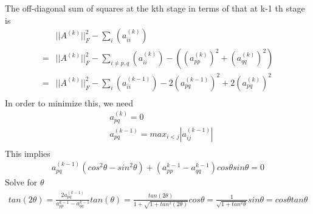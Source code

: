 \documentclass[a4paper]{article}
\begin{document}
The off-diagonal sum of squares at the kth stage in terms of that at k-1 th stage is
\begin{align*}
	& || A^{(k)}||^2_F - \sum_i (a_{ii}^{(k)}) \\
	= & || A^{(k)}||^2_F - \sum_{i \neq p,q} (a_{ii}^{(k)}) -( (a_{pp}^{(k)})^2 + (a_{qq}^{(k)})^2 ) \\
	= & || A^{(k)}||^2_F - \sum_i (a_{ii}^{(k-1)}) - 2 (a_{pq}^{(k-1)})^2  + 2 (a_{pq}^{(k)})^2  \\
\end{align*}
In order to minimize this, we need
\begin{align*}
	& a_{pq}^{(k)} = 0\\
	& a_{pq}^{(k-1)} = max _{i<j} |a_{ij} ^ {(k-1)}|\\
\end{align*}
This implies
\begin{align*}
	a_{pq}^{(k-1)} (cos^2 \theta - sin^2 \theta) + (a_{pp}^{k-1} - a_{qq}^{k-1}) cos \theta sin \theta = 0
\end{align*}
Solve for $\theta$
\begin{align*}
	tan(2\theta) = \frac{2 a_{pq}^{(k-1)}}{a_{pp}^{k-1} - a_{qq}^{k-1}}
	tan(\theta) = \frac{tan(2 \theta)}{1 + \sqrt{1 + tan^2 (2 \theta)}}
	cos \theta = \frac{1}{\sqrt{1 + tan^2 \theta}}
	sin \theta = cos \theta tan \theta
\end{align*}
\end{document}
